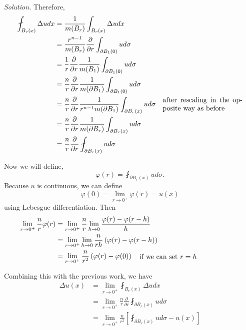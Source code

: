 \documentclass[a4paper]{article}
\newenvironment{solution}{\emph{Solution.}}{}
\begin{document}
\begin{enumerate}
\begin{solution}
      Therefore,
      \begin{align*}
        \fint_{B_r(x)}^{} \Delta u dx
        &=\frac{1}{m(B_r)} \int_{B_r(x)}^{} \Delta u dx \\
        &= \frac{r^{n-1}}{m(B_r)} \frac{\partial}{\partial r} \int_{\partial B_1(0)}^{} u d\sigma \\
        &= \frac{1}{r} \frac{\partial}{\partial r} \frac{1}{m(B_1)} \int_{\partial B_1(0)}^{} u d\sigma \\
        &= \frac{n}{r} \frac{\partial}{\partial r} \frac{1}{m(\partial B_1)} \int_{\partial B_1(0)}^{} u d\sigma \\
        &= \frac{n}{r} \frac{\partial}{\partial r} \frac{1}{r^{n-1} m(\partial B_1)} \int_{\partial B_r(x)}^{} u d\sigma \quad \parbox{4cm}{after
        rescaling in the opposite way as before} \\
        &= \frac{n}{r} \frac{\partial}{\partial r} \frac{1}{m(\partial B_r)} \int_{\partial B_r(x)}^{} u d\sigma \\
        &= \frac{n}{r} \frac{\partial}{\partial r} \fint_{\partial B_r(x)}^{} u d\sigma
      \end{align*}

      Now we will define,
      \[ \varphi(r) = \fint_{\partial B_r(x)}^{} u d \sigma .\]
      Because $u$ is continuous, we can define
      \[ \varphi(0) = \lim_{r \to 0^+} \varphi(r) = u(x) \]
      using Lebesgue differentiation. Then
      \begin{align*}
        \lim_{r \to 0^+} \frac{n}{r} \varphi(r)
        &= \lim_{r \to 0^+} \frac{n}{r} \lim_{h \to 0} \frac{\varphi(r) - \varphi(r-h)}{h} \\
        &= \lim_{r \to 0^+} \lim_{h \to 0} \frac{n}{rh} \left( \varphi(r) - \varphi(r-h) \right) \\
        &= \lim_{r \to 0^+} \frac{n}{r^2} \left( \varphi(r) - \varphi(0) \right) \quad \parbox{5cm}{if we can set $r = h$}
      \end{align*}

      Combining this with the previous work, we have
      \begin{align*}
        \Delta u(x) &= \lim_{r \to 0^+} \fint_{B_r(x)}^{} \Delta u dx \\
        &= \lim_{r \to 0^+} \frac{n}{r} \frac{\partial}{\partial r} \fint_{\partial B_r(x)}^{} u d \sigma \\
        &= \lim_{r \to 0^+} \frac{n}{r^2} \left[ \fint_{\partial B_r(x)}^{} u d\sigma - u(x) \right]
      \end{align*}


\end{solution}
\end{enumerate}
\end{document}
